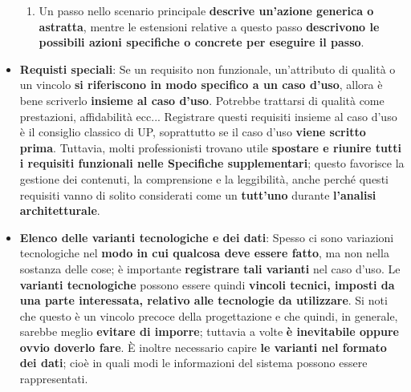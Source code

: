 \documentclass[12pt]{article}
\begin{document}
\begin{itemize}
\begin{enumerate}
        \item Un passo nello scenario principale \textbf{descrive un'azione generica o astratta}, mentre le estensioni relative a questo passo \textbf{descrivono le possibili azioni specifiche o concrete per eseguire il passo}.
    \end{enumerate}
    \item \textbf{Requisti speciali}: Se un requisito non funzionale, un'attributo di qualità o un vincolo \textbf{si riferiscono in modo specifico a un caso d'uso}, allora è bene scriverlo \textbf{insieme al caso d'uso}. Potrebbe trattarsi di qualità come prestazioni, affidabilità ecc... 
    Registrare questi requisiti insieme al caso d'uso è il consiglio classico di UP, soprattutto se il caso d'uso \textbf{viene scritto prima}. Tuttavia, molti professionisti trovano utile \textbf{spostare e riunire tutti i requisiti funzionali nelle Specifiche supplementari};
    questo favorisce la gestione dei contenuti, la comprensione e la leggibilità, anche perché questi requisiti vanno di solito considerati come un \textbf{tutt'uno} durante \textbf{l'analisi architetturale}.
    \item \textbf{Elenco delle varianti tecnologiche e dei dati}: Spesso ci sono variazioni tecnologiche nel \textbf{modo in cui qualcosa deve essere fatto}, ma non nella sostanza delle cose;
    è importante \textbf{registrare tali varianti} nel caso d'uso. Le \textbf{varianti tecnologiche} possono essere quindi \textbf{vincoli tecnici, imposti da una parte interessata, relativo alle tecnologie da utilizzare}. Si noti che questo è un vincolo precoce della progettazione e che quindi, in generale, sarebbe meglio \textbf{evitare di imporre};
    tuttavia a volte \textbf{è inevitabile oppure ovvio doverlo fare}.
    È inoltre necessario capire \textbf{le varianti nel formato dei dati}; cioè in quali modi le informazioni del sistema possono essere rappresentati.
\end{itemize}
\end{document}
